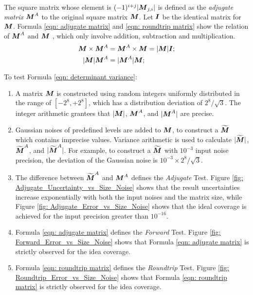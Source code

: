 \documentclass[twoside]{article}
\numberwithin{equation}{section}
\begin{document}
The square matrix whose element is $(-1)^{i+j}|\protect{\textrm{\boldmath $M$}}_{j,i}|$ is defined as the \emph{adjugate matrix} \cite{Linear_Algebra} $\protect{\textrm{\boldmath $M$}}^A$ to the original square matrix $\protect{\textrm{\boldmath $M$}}$.
Let $\protect{\textrm{\boldmath $I$}}$ be the identical matrix for $\protect{\textrm{\boldmath $M$}}$.
Formula \eqref{eqn: adjugate matrix} and \eqref{eqn: roundtrip matrix} show the relation of $\protect{\textrm{\boldmath $M$}}^A$ and $\protect{\textrm{\boldmath $M$}}$ \cite{Linear_Algebra}, which only involve addition, subtraction and multiplication.
\begin{align}
\label{eqn: adjugate matrix}
\protect{\textrm{\boldmath $M$}} \times \protect{\textrm{\boldmath $M$}}^A &= \protect{\textrm{\boldmath $M$}}^A \times \protect{\textrm{\boldmath $M$}} = |\protect{\textrm{\boldmath $M$}}| \protect{\textrm{\boldmath $I$}}; \\
\label{eqn: roundtrip matrix}
|\protect{\textrm{\boldmath $M$}}| \protect{\textrm{\boldmath $M$}}^A &=|\protect{\textrm{\boldmath $M$}}^A| \protect{\textrm{\boldmath $M$}};
\end{align}

To test Formula \eqref{eqn: determinant variance}:
\begin{enumerate}
\item A matrix $\protect{\textrm{\boldmath $M$}}$ is constructed using random integers uniformly distributed in the range of $[-2^8, +2^8]$, which has a distribution deviation of $2^8/\sqrt{3}$.
The integer arithmetic grantees that $|\protect{\textrm{\boldmath $M$}}|$, $\protect{\textrm{\boldmath $M$}}^A$, and $|\protect{\textrm{\boldmath $M$}}^A|$ are precise.

\item Gaussian noises of predefined levels are added to $\protect{\textrm{\boldmath $M$}}$, to construct a $\widetilde{\protect{\textrm{\boldmath $M$}}}$ which contains imprecise values.
Variance arithmetic is used to calculate $|\widetilde{\protect{\textrm{\boldmath $M$}}}|$, $\widetilde{\protect{\textrm{\boldmath $M$}}}^A$, and $|\widetilde{\protect{\textrm{\boldmath $M$}}}^A|$.
For example, to construct a $\widetilde{\protect{\textrm{\boldmath $M$}}}$ with $10^{-3}$ input noise precision, the deviation of the Gaussian noise is $10^{-3} \times 2^8/\sqrt{3}$.

\item The difference between $\widetilde{\protect{\textrm{\boldmath $M$}}}^A$ and $\protect{\textrm{\boldmath $M$}}^A$ defines the \emph{Adjugate} Test.
Figure \ref{fig: Adjugate_Uncertainty_vs_Size_Noise} shows that the result uncertainties increase exponentially with both the input noises and the matrix size, while Figure \ref{fig: Adjugate_Error_vs_Size_Noise} shows that the ideal coverage is achieved for the input precision greater than $10^{-16}$.

\item Formula \eqref{eqn: adjugate matrix} defines the \emph{Forward} Test.
Figure \ref{fig: Forward_Error_vs_Size_Noise} shows that Formula \eqref{eqn: adjugate matrix} is strictly observed for the idea coverage.

\item Formula \eqref{eqn: roundtrip  matrix} defines the \emph{Roundtrip} Test.
Figure \ref{fig: Roundtrip_Error_vs_Size_Noise} shows that Formula \eqref{eqn: roundtrip matrix} is strictly observed for the idea coverage.

\end{enumerate}
\end{document}

